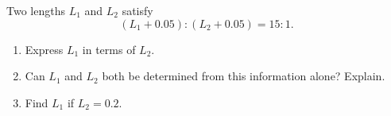 Two lengths $L_1$ and $L_2$ satisfy
\[(L_1+0.05):(L_2+0.05)=15:1.\]
\begin{enumerate}
\item[(a)] Express $L_1$ in terms of $L_2$.
\item[(b)] Can $L_1$ and $L_2$ both be determined from this information alone? Explain.
\item[(c)] Find $L_1$ if $L_2=0.2$.
\end{enumerate}
